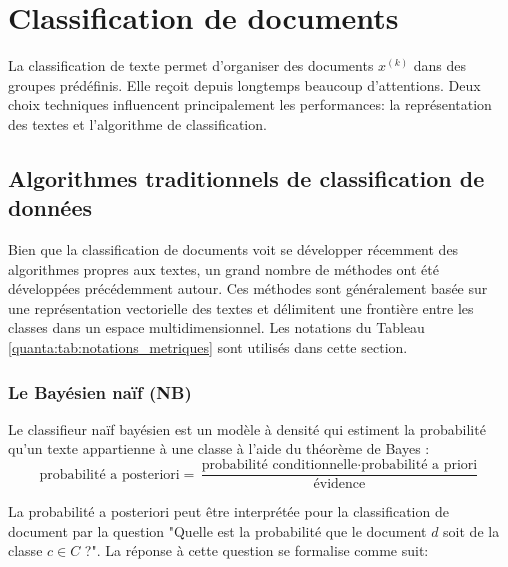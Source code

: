 \section{Classification de documents}
\label{sec:sensresultat:biblio_classif}

La classification de texte permet d'organiser des documents $x^{(k)}$ dans des groupes prédéfinis. Elle reçoit depuis longtemps beaucoup d'attentions. Deux choix techniques influencent principalement les performances: la représentation des textes et l'algorithme de classification. 

\subsection{Algorithmes traditionnels de classification de données}
Bien que la classification de documents voit se développer récemment des algorithmes propres aux textes, un grand nombre de méthodes ont été développées précédemment autour. Ces méthodes sont généralement basée sur une représentation vectorielle des textes et délimitent une frontière entre les classes dans un espace multidimensionnel. Les notations du Tableau \ref{quanta:tab:notations_metriques} sont utilisés dans cette section.

\subsubsection{Le Bayésien naïf (NB)}
Le classifieur naïf bayésien \citep{duda1973patternclass} est  un modèle à densité qui estiment la probabilité qu'un texte appartienne à une classe à l'aide du théorème de Bayes \citep{raschka2014naivebayes}:
\begin{equation}
\text{probabilité a posteriori} = \frac{\text{probabilité conditionnelle} \cdot \text{probabilité a priori}}{\text{évidence}}
\end{equation}

La probabilité a posteriori peut être interprétée pour la classification de document par la question "Quelle est la probabilité que le document $d$ soit de la classe $c \in C$ ?". La réponse à cette question se formalise comme suit:

